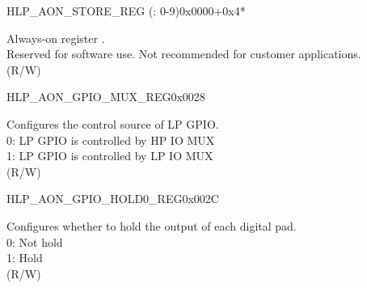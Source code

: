 \begin{register}{H}{LP\_AON\_STORE\_REG (: 0-9)}{0x0000+0x4*}\label{regdesc:LPAONSTORENREG}
%
\regnewline%
\begin{regdesc}\begin{reglist}
\label{fielddesc:LPAONLPAONSTOREN}\item [LP\_AON\_LP\_AON\_STORE\regindex{n}] Always-on register .\\
Reserved for software use. Not recommended for customer applications.\\
(R/W)
\end{reglist}\end{regdesc}
\end{register}


\begin{register}{H}{LP\_AON\_GPIO\_MUX\_REG}{0x0028}\label{regdesc:LPAONGPIOMUXREG}
%
%
\regnewline%
\begin{regdesc}\begin{reglist}
\label{fielddesc:LPAONGPIOMUXSEL}\item [LP\_AON\_GPIO\_MUX\_SEL] Configures the control source of LP GPIO.\\
0: LP GPIO is controlled by HP IO MUX\\
1: LP GPIO is controlled by LP IO MUX\\
(R/W)
\end{reglist}\end{regdesc}
\end{register}


\begin{register}{H}{LP\_AON\_GPIO\_HOLD0\_REG}{0x002C}\label{regdesc:LPAONGPIOHOLD0REG}
%
\regnewline%
\begin{regdesc}\begin{reglist}
\label{fielddesc:LPAONGPIOHOLD0}\item [LP\_AON\_GPIO\_HOLD0] Configures whether to hold the output of each digital pad.\\
0: Not hold\\
1: Hold\\
(R/W)
\end{reglist}\end{regdesc}
\end{register}


